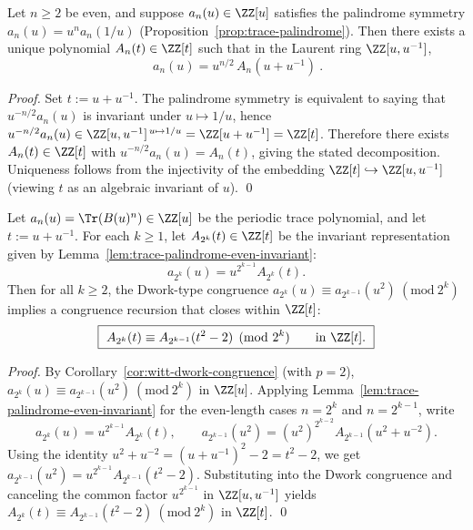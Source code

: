 \begin{lemma}[Invariant decomposition via \texorpdfstring{$t=u+u^{-1}$}{t=u+u^{-1}} for even-length palindromic traces]\label{lem:trace-palindrome-even-invariant}
Let \(n\ge 2\) be even, and suppose \(a_n(u)\in\ZZ[u]\) satisfies the palindrome symmetry
\(
a_n(u)=u^n a_n(1/u)
\)
(Proposition~\ref{prop:trace-palindrome}).
Then there exists a unique polynomial \(A_n(t)\in\ZZ[t]\) such that in the Laurent ring \(\ZZ[u,u^{-1}]\),
\[
\boxed{\ a_n(u)=u^{n/2}\,A_n\!\left(u+u^{-1}\right)\ }.
\]
\end{lemma}
\begin{proof}
Set \(t:=u+u^{-1}\).
The palindrome symmetry is equivalent to saying that \(u^{-n/2}a_n(u)\) is invariant under \(u\mapsto 1/u\), hence
\(
u^{-n/2}a_n(u)\in \ZZ[u,u^{-1}]^{\,u\mapsto 1/u}=\ZZ[u+u^{-1}]=\ZZ[t]
\).
Therefore there exists \(A_n(t)\in\ZZ[t]\) with \(u^{-n/2}a_n(u)=A_n(t)\), giving the stated decomposition.
Uniqueness follows from the injectivity of the embedding \(\ZZ[t]\hookrightarrow \ZZ[u,u^{-1}]\) (viewing \(t\) as an algebraic invariant of \(u\)). \qed
\end{proof}

\begin{theorem}[Chebyshev--Dwork congruence chain: the \texorpdfstring{$p=2$}{p=2} Frobenius closes in the invariant coordinate]\label{thm:chebyshev-dwork-congruence-chain}
Let \(a_n(u)=\Tr(B(u)^n)\in\ZZ[u]\) be the periodic trace polynomial, and let \(t:=u+u^{-1}\).
For each \(k\ge 1\), let \(A_{2^k}(t)\in\ZZ[t]\) be the invariant representation given by Lemma~\ref{lem:trace-palindrome-even-invariant}:
\[
a_{2^k}(u)=u^{2^{k-1}}A_{2^k}(t).
\]
Then for all \(k\ge 2\), the Dwork-type congruence \(a_{2^k}(u)\equiv a_{2^{k-1}}(u^2)\ (\mathrm{mod}\ 2^k)\) implies a congruence recursion that closes within \(\ZZ[t]\):
\[
\boxed{\ A_{2^k}(t)\equiv A_{2^{k-1}}(t^2-2)\pmod{2^k}\qquad\text{in }\ZZ[t].\ }
\]
\end{theorem}
\begin{proof}
By Corollary~\ref{cor:witt-dwork-congruence} (with \(p=2\)),
\(
a_{2^k}(u)\equiv a_{2^{k-1}}(u^2)\ (\mathrm{mod}\ 2^k)
\) in \(\ZZ[u]\).
Applying Lemma~\ref{lem:trace-palindrome-even-invariant} for the even-length cases \(n=2^k\) and \(n=2^{k-1}\), write
\[
a_{2^k}(u)=u^{2^{k-1}}A_{2^k}(t),\qquad
a_{2^{k-1}}(u^2)=(u^2)^{2^{k-2}}A_{2^{k-1}}(u^2+u^{-2}).
\]
Using the identity
\(
u^2+u^{-2}=(u+u^{-1})^2-2=t^2-2
\), we get
\(
a_{2^{k-1}}(u^2)=u^{2^{k-1}}A_{2^{k-1}}(t^2-2)
\).
Substituting into the Dwork congruence and canceling the common factor \(u^{2^{k-1}}\) in \(\ZZ[u,u^{-1}]\) yields
\(
A_{2^k}(t)\equiv A_{2^{k-1}}(t^2-2)\ (\mathrm{mod}\ 2^k)
\) in \(\ZZ[t]\).
\qed
\end{proof}

